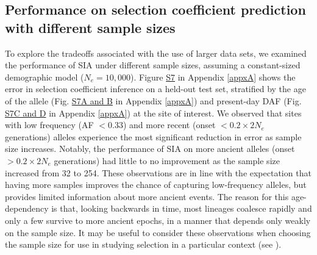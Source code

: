 \subsection{Performance on selection coefficient prediction with different sample sizes}
To explore the tradeoffs associated with the use of larger data sets, we examined the performance of \ac{SIA} under different sample sizes, assuming a constant-sized demographic model ($N_e = 10,000$). Figure \href{https://academic.oup.com/mbe/article/39/1/msab332/6433161#supplementary-data}{S7} in Appendix \ref{appxA} shows the error in selection coefficient inference on a held-out test set, stratified by the age of the allele (Fig. \href{https://academic.oup.com/mbe/article/39/1/msab332/6433161#supplementary-data}{S7A and B} in Appendix \ref{appxA}) and present-day \ac{DAF} (Fig. \href{https://academic.oup.com/mbe/article/39/1/msab332/6433161#supplementary-data}{S7C and D} in Appendix \ref{appxA}) at the site of interest. We observed that sites with low frequency (\ac{AF} $<0.33$) and more recent (onset $<0.2\times 2N_e$ generations) alleles experience the most significant reduction in error as sample size increases. Notably, the performance of \ac{SIA} on more ancient alleles (onset $>0.2\times 2N_e$ generations) had little to no improvement as the sample size increased from 32 to 254. These observations are in line with the expectation that having more samples improves the chance of capturing low-frequency alleles, but provides limited information about more ancient events. The reason for this age-dependency is that, looking backwards in time, most lineages coalesce rapidly and only a few survive to more ancient epochs, in a manner that depends only weakly on the sample size. It may be useful to consider these observations when choosing the sample size for use in studying selection in a particular context (see ).


